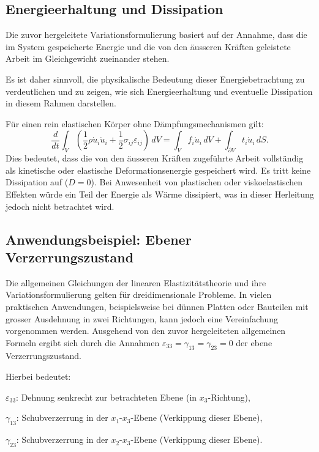 \subsection{Energieerhaltung und Dissipation}
Die zuvor hergeleitete Variationsformulierung basiert auf der Annahme, dass die im System gespeicherte Energie und die von den äusseren Kräften geleistete Arbeit im Gleichgewicht zueinander stehen. 

Es ist daher sinnvoll, die physikalische Bedeutung dieser Energiebetrachtung zu verdeutlichen und zu zeigen, wie sich Energieerhaltung und eventuelle Dissipation in diesem Rahmen darstellen.


Für einen rein elastischen Körper ohne Dämpfungsmechanismen gilt:
\begin{equation*}
	\frac{d}{dt} \int_V \left( \frac{1}{2} \rho \dot{u}_i \dot{u}_i + \frac{1}{2} \sigma_{ij} \varepsilon_{ij} \right) \, dV = 
	\int_V f_i \dot{u}_i \, dV + \int_{\partial V} t_i \dot{u}_i \, dS.
\end{equation*}
Dies bedeutet, dass die von den äusseren Kräften zugeführte Arbeit vollständig als kinetische oder elastische Deformationsenergie gespeichert wird. 
Es tritt keine Dissipation auf ($D=0$). 
Bei Anwesenheit von plastischen oder viskoelastischen Effekten würde ein Teil der Energie als Wärme dissipiert, was in dieser Herleitung jedoch nicht betrachtet wird.

\subsection{Anwendungsbeispiel: Ebener Verzerrungszustand}
Die allgemeinen Gleichungen der linearen Elastizitätstheorie und ihre Variationsformulierung gelten für dreidimensionale Probleme. 
In vielen praktischen Anwendungen, beispielsweise bei dünnen Platten oder Bauteilen mit grosser Ausdehnung in zwei Richtungen, kann jedoch eine Vereinfachung vorgenommen werden. 
Ausgehend von den zuvor hergeleiteten allgemeinen Formeln ergibt sich durch die Annahmen  \(\varepsilon_{33} = \gamma_{13} = \gamma_{23} = 0\) der ebene Verzerrungszustand. 

Hierbei bedeutet:

$\varepsilon_{33}$: Dehnung senkrecht zur betrachteten Ebene (in $x_3$-Richtung),

$\gamma_{13}$: Schubverzerrung in der $x_1$-$x_3$-Ebene (Verkippung dieser Ebene),

$\gamma_{23}$: Schubverzerrung in der $x_2$-$x_3$-Ebene (Verkippung dieser Ebene).

